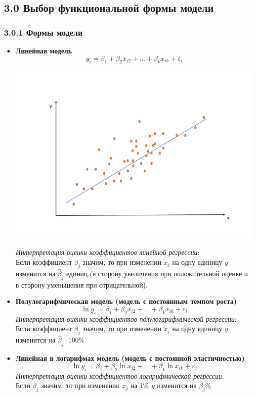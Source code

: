 \documentclass[a0,final]{a0poster}
\begin{document}
\begin{multicols}{4}
\section*{3.0 Выбор функциональной формы модели}
\subsubsection*{3.0.1 Формы модели}
\begin{itemize}
\item \textbf{Линейная модель}
\[y_i = \beta_1 + \beta_2x_{i2}+ \ldots +\beta_{k}x_{ik}+\varepsilon_i\]
\begin{center}
    \includegraphics[width=0.2\paperwidth]{linear.pdf}
\end{center}

\textit{Интерпретация оценки коэффициентов линейной регрессии}:\\
Если коэффициент $\beta_j$ значим, то при изменении $x_j$ на одну единицу $y$ изменится на $\hat{\beta}_j$ единиц (в сторону увеличения при положительной оценке и в сторону уменьшения при отрицательной). \\
\item \textbf{Полулогарифмическая модель (модель с постоянным темпом роста)}
\[\ln{y_i} = \beta_1 + \beta_2x_{i2}+ \ldots +\beta_kx_{ik}+\varepsilon_i\]
\textit{Интерпретация оценки коэффициентов полулогарифмической регрессии}:
Если коэффициент $\beta_j$ значим, то при изменении $x_j$ на одну единицу $y$ изменится на $\hat{\beta}_j\cdot 100\%$ \\
\item \textbf{Линейная в логарифмах модель (модель с постоянной эластичностью)}
\[\ln{y_i} = \beta_1 + \beta_2\ln{x_{i2}}+ \ldots +\beta_k\ln{x_{ik}}+\varepsilon_i\]
\textit{Интерпретация оценки коэффициентов логарифмической регрессии}:\\
Если $\beta_j$ значим, то при изменении $x_j$ на 1\%  $y$ изменится на $\hat{\beta}_j\%$
\end{itemize}

\end{multicols}
\end{document}
